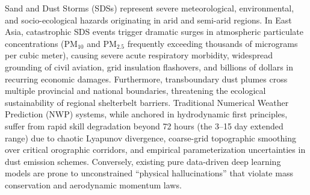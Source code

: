 \documentclass[12pt,a4paper,openany,twoside]{book}
\begin{document}
Sand and Dust Storms (SDSs) represent severe meteorological, environmental, and socio-ecological hazards originating in arid and semi-arid regions. In East Asia, catastrophic SDS events trigger dramatic surges in atmospheric particulate concentrations ($\text{PM}_{10}$ and $\text{PM}_{2.5}$ frequently exceeding thousands of micrograms per cubic meter), causing severe acute respiratory morbidity, widespread grounding of civil aviation, grid insulation flashovers, and billions of dollars in recurring economic damages. Furthermore, transboundary dust plumes cross multiple provincial and national boundaries, threatening the ecological sustainability of regional shelterbelt barriers. Traditional Numerical Weather Prediction (NWP) systems, while anchored in hydrodynamic first principles, suffer from rapid skill degradation beyond 72 hours (the 3--15 day extended range) due to chaotic Lyapunov divergence, coarse-grid topographic smoothing over critical orographic corridors, and empirical parameterization uncertainties in dust emission schemes. Conversely, existing pure data-driven deep learning models are prone to unconstrained ``physical hallucinations'' that violate mass conservation and aerodynamic momentum laws.
\end{document}
